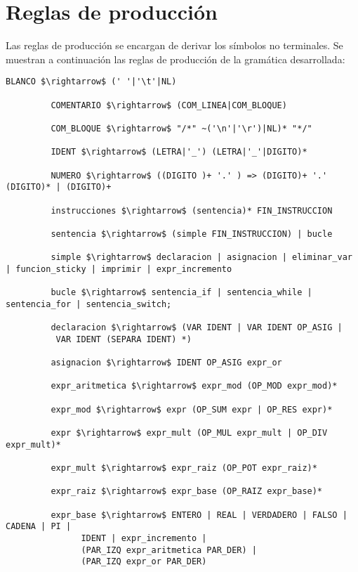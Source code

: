    \section{Reglas de producción}
   Las reglas de producción se encargan de derivar los símbolos no terminales. Se muestran a continuación las reglas de producción de la
   gramática desarrollada:
       \begin{lstlisting}[escapechar=\$]
         BLANCO $\rightarrow$ (' '|'\t'|NL)

         COMENTARIO $\rightarrow$ (COM_LINEA|COM_BLOQUE)

         COM_BLOQUE $\rightarrow$ "/*" ~('\n'|'\r')|NL)* "*/"

         IDENT $\rightarrow$ (LETRA|'_') (LETRA|'_'|DIGITO)*

         NUMERO $\rightarrow$ ((DIGITO )+ '.' ) => (DIGITO)+ '.' (DIGITO)* | (DIGITO)+

         instrucciones $\rightarrow$ (sentencia)* FIN_INSTRUCCION

         sentencia $\rightarrow$ (simple FIN_INSTRUCCION) | bucle

         simple $\rightarrow$ declaracion | asignacion | eliminar_var | funcion_sticky | imprimir | expr_incremento
         
         bucle $\rightarrow$ sentencia_if | sentencia_while | sentencia_for | sentencia_switch;

         declaracion $\rightarrow$ (VAR IDENT | VAR IDENT OP_ASIG | 
          VAR IDENT (SEPARA IDENT) *)
    
         asignacion $\rightarrow$ IDENT OP_ASIG expr_or
         
         expr_aritmetica $\rightarrow$ expr_mod (OP_MOD expr_mod)*
         
         expr_mod $\rightarrow$ expr (OP_SUM expr | OP_RES expr)*
         
         expr $\rightarrow$ expr_mult (OP_MUL expr_mult | OP_DIV expr_mult)*
         
         expr_mult $\rightarrow$ expr_raiz (OP_POT expr_raiz)*
         
         expr_raiz $\rightarrow$ expr_base (OP_RAIZ expr_base)*
         
         expr_base $\rightarrow$ ENTERO | REAL | VERDADERO | FALSO | CADENA | PI | 
               IDENT | expr_incremento | 
               (PAR_IZQ expr_aritmetica PAR_DER) | 
               (PAR_IZQ expr_or PAR_DER)
         

\end{lstlisting}
